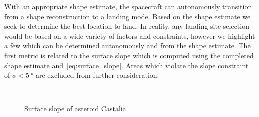 With an appropriate shape estimate, the spacecraft can autonomously transition from a shape reconstruction to a landing mode.
Based on the shape estimate we seek to determine the best location to land. 
In reality, any landing site selection would be based on a wide variety of factors and constraints, however we highlight a few which can be determined autonomously and from the shape estimate.
The first metric is related to the surface slope which is computed using the completed shape estimate and~\cref{eq:surface_slope}.
Areas which violate the slope constraint of \( \phi < \SI{5}{\degree} \) are excluded from further consideration.
\begin{figure}[htbp]
    \centering
    \\%
    \caption{Surface slope of asteroid Castalia\label{fig:surface_slope_castalia_both}}
\end{figure}

